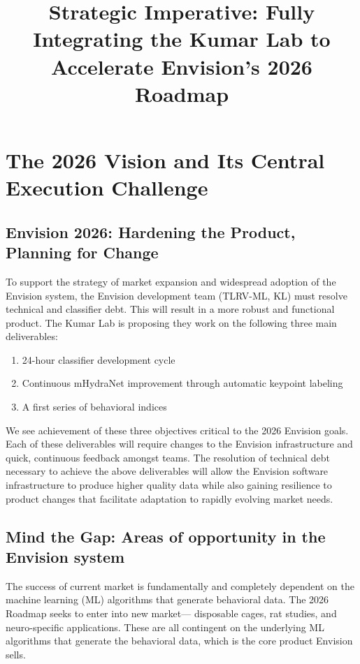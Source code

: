 \documentclass[11pt,a4paper]{article}
\title{Strategic Imperative: Fully Integrating the Kumar Lab to Accelerate Envision's 2026 Roadmap}
\author{}
\date{}
\begin{document}
\maketitle

\section{The 2026 Vision and Its Central Execution Challenge}

\subsection{Envision 2026: Hardening the Product, Planning for Change}

To support the strategy of market expansion and widespread adoption of the Envision system,
the Envision development team (TLRV-ML, KL) must resolve technical and classifier debt. This will result in a more robust and functional product. The Kumar Lab is proposing they work on the following three main deliverables:

\begin{enumerate}
    \item 24-hour classifier development cycle
    \item Continuous mHydraNet improvement through automatic keypoint labeling
    \item A first series of behavioral indices
\end{enumerate}

We see achievement of these three objectives critical to the 2026 Envision goals. Each of these deliverables will require changes to the Envision infrastructure and quick, continuous feedback amongst teams. The resolution of technical debt necessary to achieve the above deliverables will allow the Envision software infrastructure to produce higher quality data while also gaining resilience to product changes that facilitate adaptation to rapidly evolving market needs.

\subsection{Mind the Gap: Areas of opportunity in the Envision system}

The success of current market is fundamentally and completely dependent on the machine learning (ML) algorithms that generate behavioral data. The 2026 Roadmap seeks to enter into new market— disposable cages, rat studies, and neuro-specific applications. These are all contingent on the underlying ML algorithms that generate the behavioral data, which is the core product Envision sells.
\end{document}
